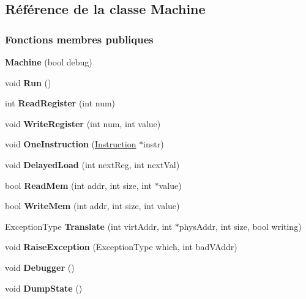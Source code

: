 \hypertarget{class_machine}{}\subsection{Référence de la classe Machine}
\label{class_machine}
\subsubsection*{Fonctions membres publiques}
\begin{DoxyCompactItemize}
\item 
\hypertarget{class_machine_ad5958275a54dbc299b71ecdba7da0604}{}\label{class_machine_ad5958275a54dbc299b71ecdba7da0604} 
{\bfseries Machine} (bool debug)
\item 
\hypertarget{class_machine_a83444e06eb7a7c163a1b9c87a7062d43}{}\label{class_machine_a83444e06eb7a7c163a1b9c87a7062d43} 
void {\bfseries Run} ()
\item 
\hypertarget{class_machine_a6a8ed459cb3700c406564db72957bae3}{}\label{class_machine_a6a8ed459cb3700c406564db72957bae3} 
int {\bfseries Read\+Register} (int num)
\item 
\hypertarget{class_machine_ad58cc61e347395586a1cb91272dc4d61}{}\label{class_machine_ad58cc61e347395586a1cb91272dc4d61} 
void {\bfseries Write\+Register} (int num, int value)
\item 
\hypertarget{class_machine_af8d77f2964313173f1bada56bc596e48}{}\label{class_machine_af8d77f2964313173f1bada56bc596e48} 
void {\bfseries One\+Instruction} (\hyperlink{class_instruction}{Instruction} $\ast$instr)
\item 
\hypertarget{class_machine_a11fda0ddf1f16d8b1a06f75d1ab5b8a1}{}\label{class_machine_a11fda0ddf1f16d8b1a06f75d1ab5b8a1} 
void {\bfseries Delayed\+Load} (int next\+Reg, int next\+Val)
\item 
\hypertarget{class_machine_a01f1647867db027c04b6290b46dd988d}{}\label{class_machine_a01f1647867db027c04b6290b46dd988d} 
bool {\bfseries Read\+Mem} (int addr, int size, int $\ast$value)
\item 
\hypertarget{class_machine_a1f442601e649b537a65b8b2440342227}{}\label{class_machine_a1f442601e649b537a65b8b2440342227} 
bool {\bfseries Write\+Mem} (int addr, int size, int value)
\item 
\hypertarget{class_machine_a754ddcbc077cc91463398de8b0f1d077}{}\label{class_machine_a754ddcbc077cc91463398de8b0f1d077} 
Exception\+Type {\bfseries Translate} (int virt\+Addr, int $\ast$phys\+Addr, int size, bool writing)
\item 
\hypertarget{class_machine_a0d6f63790c0568437b100171f61fd77f}{}\label{class_machine_a0d6f63790c0568437b100171f61fd77f} 
void {\bfseries Raise\+Exception} (Exception\+Type which, int bad\+V\+Addr)
\item 
\hypertarget{class_machine_a08d36bd75e689830c73e307e1c7f7e28}{}\label{class_machine_a08d36bd75e689830c73e307e1c7f7e28} 
void {\bfseries Debugger} ()
\item 
\hypertarget{class_machine_a4e4dee4ed66da41de9bbebb161efd06f}{}\label{class_machine_a4e4dee4ed66da41de9bbebb161efd06f} 
void {\bfseries Dump\+State} ()
\end{DoxyCompactItemize}
